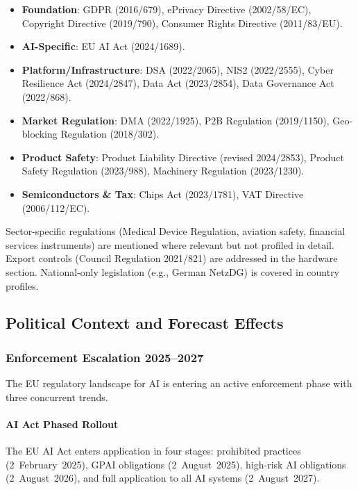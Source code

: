 \documentclass[11pt,a4paper]{article}
\begin{document}
\begin{itemize}
  \item \textbf{Foundation}: GDPR (2016/679), ePrivacy Directive (2002/58/EC), Copyright Directive (2019/790), Consumer Rights Directive (2011/83/EU).
  \item \textbf{AI-Specific}: EU AI Act (2024/1689).
  \item \textbf{Platform/Infrastructure}: DSA (2022/2065), NIS2 (2022/2555), Cyber Resilience Act (2024/2847), Data Act (2023/2854), Data Governance Act (2022/868).
  \item \textbf{Market Regulation}: DMA (2022/1925), P2B Regulation (2019/1150), Geo-blocking Regulation (2018/302).
  \item \textbf{Product Safety}: Product Liability Directive (revised 2024/2853), Product Safety Regulation (2023/988), Machinery Regulation (2023/1230).
  \item \textbf{Semiconductors \& Tax}: Chips Act (2023/1781), VAT Directive (2006/112/EC).
\end{itemize}

Sector-specific regulations (Medical Device Regulation, aviation safety, financial services instruments) are mentioned where relevant but not profiled in detail. Export controls (Council Regulation 2021/821) are addressed in the hardware section. National-only legislation (e.g., German NetzDG) is covered in country profiles.

\subsection{Political Context and Forecast Effects}
\label{sec:political-context}

\subsubsection{Enforcement Escalation 2025--2027}

The EU regulatory landscape for AI is entering an active enforcement phase with three concurrent trends.

\paragraph{AI Act Phased Rollout} The EU AI Act enters application in four stages: prohibited practices (2~February~2025), GPAI obligations (2~August~2025), high-risk AI obligations (2~August~2026), and full application to all AI systems (2~August~2027).
\end{document}
